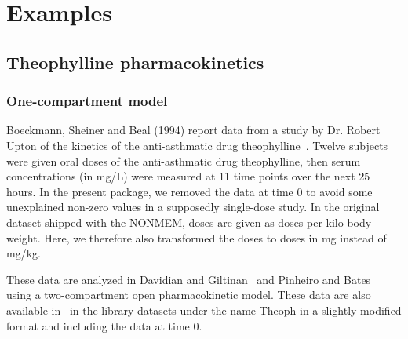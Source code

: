 




\chapter{Examples} \label{chapter_example} \label{sec:examples}

\section{Theophylline pharmacokinetics} \label{sec:exampletheo}

\subsection{One-compartment model}

Boeckmann, Sheiner and Beal (1994) report data from a study by Dr. Robert Upton of the kinetics of the anti-asthmatic drug theophylline~\cite{NONMEM}. Twelve subjects were given oral doses of the anti-asthmatic drug theophylline, then serum concentrations (in mg/L) were measured at 11 time points over the next 25 hours. In the present package, we removed the data at time 0 to avoid some unexplained non-zero values in a supposedly single-dose study. In the original dataset shipped with the {\sf NONMEM}, doses are given as doses per kilo body weight. Here, we therefore also transformed the doses to doses in mg instead of mg/kg.

These data are analyzed in Davidian and Giltinan~\cite{Davidian95} and Pinheiro and Bates~\cite{Pinheiro95} using a two-compartment open pharmacokinetic model. These data are also available in \R~in the library {\sf datasets} under the name {\sf Theoph} in a slightly modified format and including the data at time 0.


